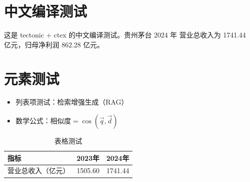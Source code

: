 \documentclass[UTF8]{ctexart}
\begin{document}
\section{中文编译测试}
这是 tectonic + ctex 的中文编译测试。贵州茅台 2024 年
营业总收入为 1741.44 亿元，归母净利润 862.28 亿元。

\section{元素测试}
\begin{itemize}
  \item 列表项测试：检索增强生成（RAG）
  \item 数学公式：$\text{相似度} = \cos(\vec{q}, \vec{d})$
\end{itemize}

\begin{table}[h]
\centering
\begin{tabular}{lrr}
\toprule
指标 & 2023年 & 2024年 \\
\midrule
营业总收入（亿元） & 1505.60 & 1741.44 \\
\bottomrule
\end{tabular}
\caption{表格测试}
\end{table}
\end{document}
